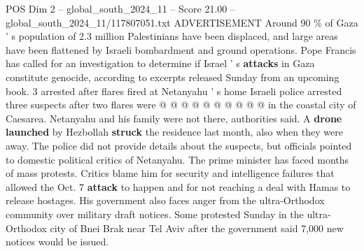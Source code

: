 \begin{textsample}{POS Dim 2 – global\_south\_2024\_11 – Score 21.00 – global\_south\_2024\_11/117807051.txt}
ADVERTISEMENT Around 90 \% of Gaza ' s population of 2.3 million Palestinians have been displaced, and large areas have been flattened by Israeli bombardment and ground operations.
Pope Francis has called for an investigation to determine if Israel ' s \textbf{attacks} in Gaza constitute genocide, according to excerpts released Sunday from an upcoming book. 3 arrested after flares fired at Netanyahu ' s home Israeli police arrested three suspects after two flares were @ @ @ @ @ @ @ @ @ @ in the coastal city of Caesarea.
Netanyahu and his family were not there, authorities said.
A \textbf{drone} \textbf{launched} by Hezbollah \textbf{struck} the residence last month, also when they were away.
The police did not provide details about the suspects, but officials pointed to domestic political critics of Netanyahu.
The prime minister has faced months of mass protests.
Critics blame him for security and intelligence failures that allowed the Oct. 7 \textbf{attack} to happen and for not reaching a deal with Hamas to release hostages.
His government also faces anger from the ultra-Orthodox community over military draft notices.
Some protested Sunday in the ultra-Orthodox city of Bnei Brak near Tel Aviv after the government said 7,000 new notices would be issued.

\end{textsample}
